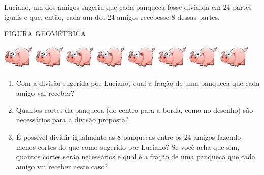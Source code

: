 \documentclass[a4,12pt]{book}
\begin{document}
Luciano, um dos amigos sugeriu que cada panqueca fosse dividida em $24$ partes iguais e que, então, cada um dos 24 amigos recebesse $8$ dessas partes.
\begin{imagem*}[breakable]{}{}   FIGURA GEOMÉTRICA  
  
    \includegraphics[width=42pt, keepaspectratio]{pig}  
    \includegraphics[width=42pt, keepaspectratio]{pig}  
    \includegraphics[width=42pt, keepaspectratio]{pig}  
    \includegraphics[width=42pt, keepaspectratio]{pig}  
    \includegraphics[width=42pt, keepaspectratio]{pig}  
    \includegraphics[width=42pt, keepaspectratio]{pig}  
    \includegraphics[width=42pt, keepaspectratio]{pig}  
    \includegraphics[width=42pt, keepaspectratio]{pig}  
\end{imagem*}

\begin{enumerate} [\quad a)] %
  \item     Com a divisão sugerida por Luciano, qual a fração de uma panqueca que cada amigo vai receber?
  \item     Quantos cortes da panqueca (do centro para a borda, como no desenho) são necessários para a divisão proposta?
  \item     É possível dividir igualmente as     $8$     panquecas entre os     $24$     amigos fazendo menos cortes do que como sugerido por Luciano? Se você acha que sim, quantos cortes serão necessários e qual é a fração de uma panqueca que cada amigo vai receber neste caso?
\end{enumerate} %
\end{document}
